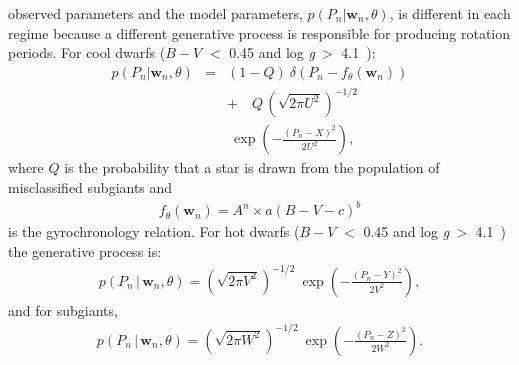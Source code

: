 \documentclass[useAMS, usenatbib]{mn2e}
\newcommand{\logg}{log \emph{g}}
\newcommand{\w}{\mathbf{w}}
\newcommand{\subcut}{4.1~}
\begin{document}
observed parameters and the model parameters, $p(P_n|\w_n, \theta)$, is
different in each regime because a different generative process is responsible
for producing rotation periods.
For cool dwarfs ($B-V$ $<$ 0.45 and \logg$~>$ \subcut):
\begin{eqnarray} \label{eq:codw}
p(P_n|\w_n,\theta) &=&
    (1-Q)~\delta \left (P_n - f_\theta(\w_n)\right) \\ \nonumber
    && +\quad Q\,\left(\sqrt{2\pi U^2}\right)^{-1/2} \\ \nonumber
    &&	~\exp\left({-\frac{(P_n-X)^2}{2U^2}}\right),
\end{eqnarray}
where $Q$ is the probability that a star is drawn from the population of
misclassified subgiants and
\begin{eqnarray}
f_\theta(\w_n) = A^n \times a(B-V - c)^b
\end{eqnarray}
is the gyrochronology relation.
For hot dwarfs ($B-V$ $<$ 0.45 and \logg$~>$ \subcut) the generative process
is:
\begin{eqnarray}
p(P_n\,|\,\w_n,\theta) = \left(\sqrt{2\pi V^2}\right)^{-1/2}~
\exp\left({-\frac{(P_n-Y)^2}{2V^2}}\right),
\end{eqnarray}
and for subgiants,
\begin{eqnarray}
p(P_n\,|\,\w_n,\theta) = \left(\sqrt{2\pi W^2}\right)^{-1/2}~
\exp\left({-\frac{(P_n-Z)^2}{2W^2}}\right).
\end{eqnarray}
\end{document}

